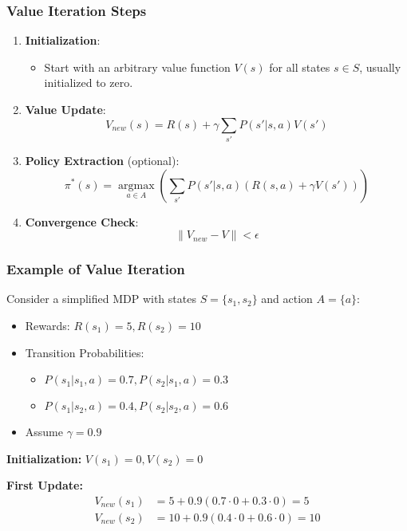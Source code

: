 \documentclass[aspectratio=169]{beamer}
\begin{document}
\begin{frame}[fragile]
    \frametitle{Value Iteration Steps}
    \begin{enumerate}
        \item \textbf{Initialization}:
        \begin{itemize}
            \item Start with an arbitrary value function $V(s)$ for all states $s \in S$, usually initialized to zero.
        \end{itemize}

        \item \textbf{Value Update}:
        \begin{equation}
            V_{new}(s) = R(s) + \gamma \sum_{s'} P(s' | s, a) V(s')
        \end{equation}

        \item \textbf{Policy Extraction} (optional):
        \begin{equation}
            \pi^*(s) = \underset{a \in A}{\operatorname{argmax}} \left( \sum_{s'} P(s' | s, a) \left( R(s, a) + \gamma V(s') \right) \right)
        \end{equation}

        \item \textbf{Convergence Check}:
        \begin{equation}
            \| V_{new} - V \| < \epsilon
        \end{equation}
    \end{enumerate}
\end{frame}

\begin{frame}[fragile]
    \frametitle{Example of Value Iteration}
    Consider a simplified MDP with states $S = \{s_1, s_2\}$ and action $A = \{a\}$:
    \begin{itemize}
        \item Rewards: $R(s_1) = 5, R(s_2) = 10$
        \item Transition Probabilities:
        \begin{itemize}
            \item $P(s_1 | s_1, a) = 0.7, P(s_2 | s_1, a) = 0.3$
            \item $P(s_1 | s_2, a) = 0.4, P(s_2 | s_2, a) = 0.6$
        \end{itemize}
        \item Assume $\gamma = 0.9$
    \end{itemize}

    \textbf{Initialization:} $V(s_1) = 0, V(s_2) = 0$

    \textbf{First Update:}
    \begin{align*}
        V_{new}(s_1) &= 5 + 0.9(0.7 \cdot 0 + 0.3 \cdot 0) = 5 \\
        V_{new}(s_2) &= 10 + 0.9(0.4 \cdot 0 + 0.6 \cdot 0) = 10
    \end{align*}
\end{frame}
\end{document}
